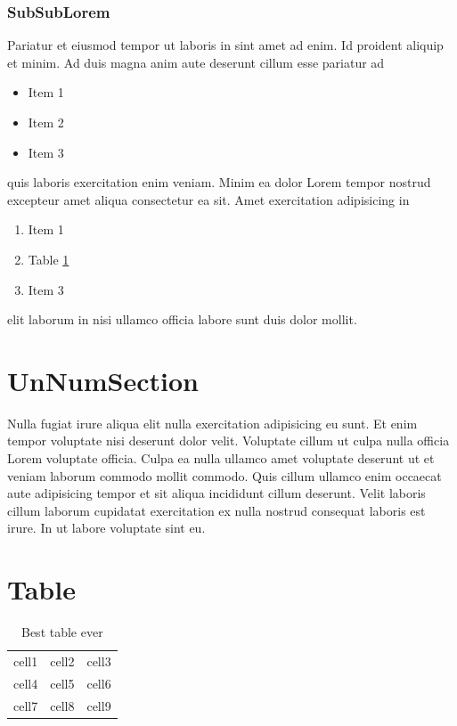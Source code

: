 \documentclass[a4paper]{article}
\begin{document}
    \subsubsection{SubSubLorem}
    Pariatur et eiusmod tempor ut laboris in sint amet ad enim. Id proident 
    aliquip et minim. Ad duis magna anim aute deserunt cillum esse pariatur ad 
    
    \begin{itemize}
        \item Item 1
        \item Item 2
        \item Item 3
    \end{itemize}

    
    quis laboris exercitation enim veniam. Minim ea dolor Lorem tempor nostrud 
    excepteur amet aliqua consectetur ea sit. Amet exercitation adipisicing in 

    \begin{enumerate}
        \item Item 1
        \item Table \ref{tab:tableTest}
        \item Item 3
    \end{enumerate}
    elit laborum in nisi ullamco officia labore sunt duis dolor mollit.

    \section*{UnNumSection}
    Nulla fugiat irure aliqua elit nulla exercitation adipisicing eu sunt. Et enim tempor voluptate nisi deserunt dolor velit. Voluptate cillum ut culpa nulla officia Lorem voluptate officia. Culpa ea nulla ullamco amet voluptate deserunt ut et veniam laborum commodo mollit commodo. Quis cillum ullamco enim occaecat aute adipisicing tempor et sit aliqua incididunt cillum deserunt. Velit laboris cillum laborum cupidatat exercitation ex nulla nostrud consequat laboris est irure. In ut labore voluptate sint eu.
    

    \section{Table}
        \begin{table}
            \begin{center}
                \begin{tabular}{ |c|c|c| }
                    \hline
                    cell1 & cell2 & cell3 \\ 
                    cell4 & cell5 & cell6 \\  
                    cell7 & cell8 & cell9 \\    
                    \hline
                \end{tabular}
            \end{center}
            \caption{\label{tab:tableTest}Best table ever}
        \end{table}
\end{document}
